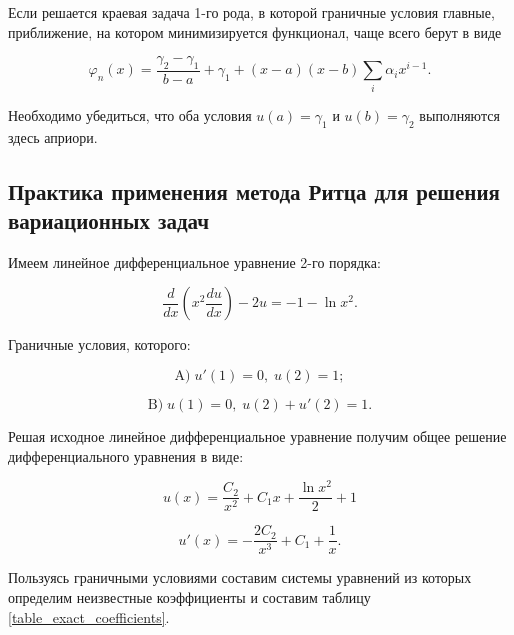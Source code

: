 \documentclass{article}
\begin{document}
Если решается краевая задача 1-го рода, в которой граничные условия главные, приближение, на котором минимизируется функционал, чаще всего берут в виде

\begin{displaymath}
	\varphi_{n}(x) = \frac{\gamma_{2} - \gamma_{1} }{ b - a } + \gamma_{1} + (x-a)(x-b) \sum_{i} \alpha_{i} x^{i - 1}.
\end{displaymath}

\begin{warn}[Важно!]
	Необходимо убедиться, что оба условия $u(a) = \gamma_{1}$ и $u(b) = \gamma_{2}$ выполняются здесь априори.
\end{warn}

\subsection{Практика применения метода Ритца для решения вариационных задач}

Имеем линейное дифференциальное уравнение 2-го порядка:

\begin{displaymath}
	\frac{d}{dx} \left( x^2 \frac{d u}{dx} \right) - 2u = -1 - \ln{x^2}.
\end{displaymath}

\noindent Граничные условия, которого:

\begin{displaymath}
	\text{A)} \; u'(1) = 0, \; u(2) = 1;
\end{displaymath}

\begin{displaymath}
	\text{B)} \; u(1) = 0, \; u(2) + u'(2) = 1.
\end{displaymath}

\noindent Решая исходное линейное дифференциальное уравнение получим общее решение дифференциального уравнения в виде:

\begin{displaymath}
	u(x) = \frac{C_{2}}{x^2} + C_{1}x + \frac{\ln{x^2}}{2} + 1
\end{displaymath}

\begin{displaymath}
	u'(x) = - \frac{2C_{2}}{x^3} + C_{1} + \frac{1}{x}.
\end{displaymath}

Пользуясь граничными условиями составим системы уравнений из которых определим неизвестные коэффициенты и составим таблицу \ref{table_exact_coefficients}. 
\end{document}
